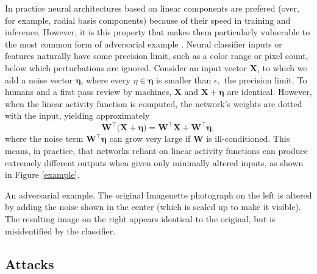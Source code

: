 \documentclass[conference]{IEEEtran}
\begin{document}
In practice neural architectures based on linear components are prefered
(over, for example, radial basis components) because of their speed in
training and inference. However, it is this property that makes them
particularly vulnerable to the most common form of adversarial example \cite%
{goodfellow2014explaining}. Neural classifier inputs or features naturally
have some precision limit, such as a color range or pixel count, below which
perturbations are ignored. Consider an input vector $\mathbf{X}$, to which
we add a noise vector $\mathbf{\eta }$, where every $\eta \in \mathbf{\eta }$
is smaller than $\epsilon ,$ the precision limit. To humans and a first pass
review by machines, $\mathbf{X}$ and $\mathbf{X+\eta }$ are identical.
However, when the linear activity function is computed, the network's
weights are dotted with the input, yielding approximately 
\begin{equation*}
\mathbf{W}^{\intercal }(\mathbf{X+\eta )=W}^{\intercal }\mathbf{X+W}%
^{\intercal }\mathbf{\eta ,}
\end{equation*}%
where the noise term $\mathbf{W}^{\intercal }\mathbf{\eta }$ can grow very
large if $\mathbf{W}$ is ill-conditioned. This means, in practice, that
networks reliant on linear activity functions can produce extremely
different outputs when given only minimally altered inputs, as shown in
Figure \ref{example}. 
\begin{minipage}{1.0\textwidth}
\end{minipage}

An adversarial example. The original Imagenette photograph on the left is
altered by adding the noise shown in the center (which is scaled up to make
it visible). The resulting image on the right appears identical to the
original, but is misidentified by the classifier.

\subsection{Attacks}
\end{document}
